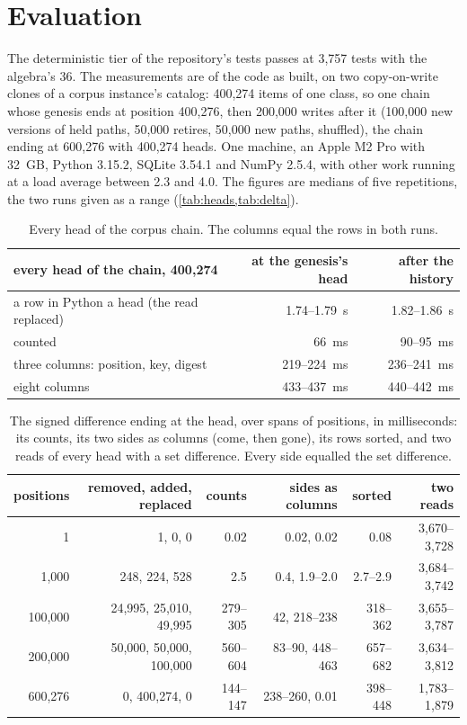 \documentclass[11pt]{article}
\theoremstyle{plain}
\theoremstyle{definition}
\begin{document}
\section{Evaluation}\label{sec:eval}

The deterministic tier of the repository's tests passes at 3{,}757 tests with the algebra's 36.
The measurements are of the code as built, on two copy-on-write clones of a corpus instance's
catalog: 400{,}274 items of one class, so one chain whose genesis ends at position 400{,}276, then
200{,}000 writes after it (100{,}000 new versions of held paths, 50{,}000 retires, 50{,}000 new
paths, shuffled), the chain ending at 600{,}276 with 400{,}274 heads. One machine, an Apple M2
Pro with 32~GB, Python 3.15.2, SQLite 3.54.1 and NumPy 2.5.4, with other work running at a load
average between 2.3 and 4.0. The figures are medians of five repetitions, the two runs given as a
range (\cref{tab:heads,tab:delta}).

\begin{table}[t]
\centering\small
\begin{tabular}{@{}lrr@{}}
\toprule
every head of the chain, 400{,}274 & at the genesis's head & after the history \\
\midrule
a row in Python a head (the read replaced) & 1.74--1.79~s & 1.82--1.86~s \\
counted & 66~ms & 90--95~ms \\
three columns: position, key, digest & 219--224~ms & 236--241~ms \\
eight columns & 433--437~ms & 440--442~ms \\
\bottomrule
\end{tabular}
\caption{Every head of the corpus chain. The columns equal the rows in both runs.}\label{tab:heads}
\end{table}

\begin{table}[t]
\centering\small
\begin{tabular}{@{}rrrrrr@{}}
\toprule
positions & removed, added, replaced & counts & sides as columns & sorted & two reads \\
\midrule
1 & 1, 0, 0 & 0.02 & 0.02, 0.02 & 0.08 & 3{,}670--3{,}728 \\
1{,}000 & 248, 224, 528 & 2.5 & 0.4, 1.9--2.0 & 2.7--2.9 & 3{,}684--3{,}742 \\
100{,}000 & 24{,}995, 25{,}010, 49{,}995 & 279--305 & 42, 218--238 & 318--362 & 3{,}655--3{,}787 \\
200{,}000 & 50{,}000, 50{,}000, 100{,}000 & 560--604 & 83--90, 448--463 & 657--682 & 3{,}634--3{,}812 \\
600{,}276 & 0, 400{,}274, 0 & 144--147 & 238--260, 0.01 & 398--448 & 1{,}783--1{,}879 \\
\bottomrule
\end{tabular}
\caption{The signed difference ending at the head, over spans of positions, in milliseconds: its
counts, its two sides as columns (come, then gone), its rows sorted, and two reads of every head
with a set difference. Every side equalled the set difference.}\label{tab:delta}
\end{table}
\end{document}
